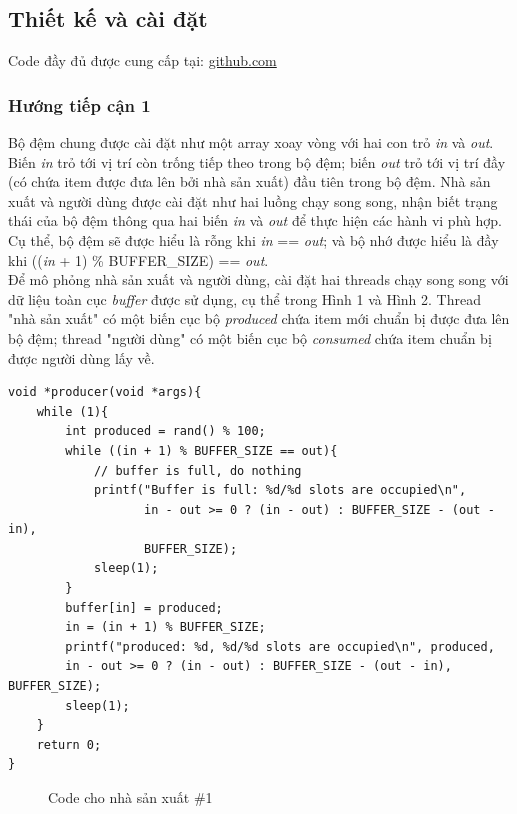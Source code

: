 \documentclass{article}
\begin{document}
\subsection{Thiết kế và cài đặt}
Code đầy đủ được cung cấp tại: \href{www.github.com}{github.com}
\subsubsection{Hướng tiếp cận 1}

Bộ đệm chung được cài đặt như một array xoay vòng với hai con trỏ \textit{in} và
\textit{out}. Biến \textit{in} trỏ tới vị trí còn trống tiếp theo trong bộ đệm;
biến \textit{out} trỏ tới vị trí đầy (có chứa item được đưa lên bởi nhà sản xuất)
đầu tiên trong bộ đệm. Nhà sản xuất và người dùng được cài đặt như hai luồng chạy
song song, nhận biết trạng thái của bộ đệm thông qua hai biến \textit{in} và \textit{out}
để thực hiện các hành vi phù hợp. Cụ thể, bộ đệm sẽ được hiểu là rỗng khi \textit{in}
== \textit{out}; và bộ nhớ được hiểu là đầy khi ((\textit{in} + 1) \% BUFFER\_SIZE)
== \textit{out}. \\

Để mô phỏng nhà sản xuất và người dùng, cài đặt hai threads chạy song song với
dữ liệu toàn cục \textit{buffer} được sử dụng, cụ thể trong Hình 1 và Hình 2.
Thread "nhà sản xuất" có một biến cục bộ \textit{produced} chứa item mới chuẩn bị
được đưa lên bộ đệm; thread "người dùng" có một biến cục bộ \textit{consumed} chứa
item chuẩn bị được người dùng lấy về.

\pagebreak

\begin{shaded}
    \begin{lstlisting}
void *producer(void *args){
    while (1){
        int produced = rand() % 100;
        while ((in + 1) % BUFFER_SIZE == out){
            // buffer is full, do nothing
            printf("Buffer is full: %d/%d slots are occupied\n",
                   in - out >= 0 ? (in - out) : BUFFER_SIZE - (out - in), 
                   BUFFER_SIZE);
            sleep(1);
        }
        buffer[in] = produced;
        in = (in + 1) % BUFFER_SIZE; 
        printf("produced: %d, %d/%d slots are occupied\n", produced, 
        in - out >= 0 ? (in - out) : BUFFER_SIZE - (out - in), BUFFER_SIZE);
        sleep(1);
    }
    return 0;
}
    \end{lstlisting}
\end{shaded}

\begin{figure}[h]
    \centering
    \caption{Code cho nhà sản xuất \#1}
\end{figure}
\end{document}
